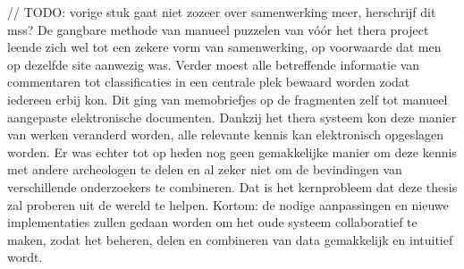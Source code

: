 // TODO: vorige stuk gaat niet zozeer over samenwerking meer, herschrijf dit
mss? De gangbare methode van manueel puzzelen van v\'o\'or het thera project leende
zich wel tot een zekere vorm van samenwerking, op voorwaarde dat men op dezelfde
site aanwezig was. Verder moest alle betreffende informatie van commentaren tot
classificaties in een centrale plek bewaard worden zodat iedereen erbij kon. Dit ging van memobriefjes op de fragmenten zelf tot manueel
aangepaste elektronische documenten. Dankzij het thera systeem kon
deze manier van werken veranderd worden, alle relevante kennis kan elektronisch
opgeslagen worden. Er was echter tot op heden nog geen gemakkelijke
manier om deze kennis met andere archeologen te delen en al zeker niet om de bevindingen van verschillende onderzoekers te combineren. 
Dat is het kernprobleem dat deze thesis zal proberen uit de wereld te helpen.
Kortom: de nodige aanpassingen en nieuwe implementaties zullen gedaan worden om het oude systeem collaboratief te maken, zodat het beheren, delen en combineren van data gemakkelijk en intuitief wordt.\\

